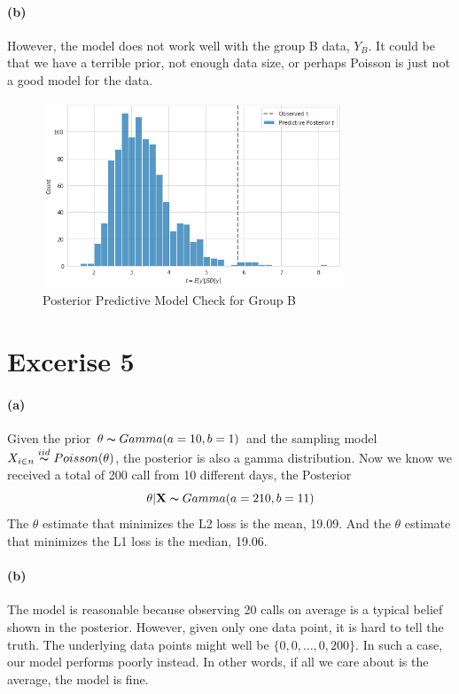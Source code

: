\documentclass[11pt, letterpaper]{article}
\begin{document}
\paragraph{(b)}
However, the model does not work well with the group B data, $Y_B$. It could be that we have a terrible prior,
not enough data size, or perhaps Poisson is just not a good model for the data.

\begin{figure}[!h]
  \centering
  \includegraphics[width=0.8\textwidth]{4.3.b.png}
  \captionsetup{justification=centering}
  \caption{Posterior Predictive Model Check for Group B}
\end{figure}
\newpage


\section{Excerise 5}
\paragraph{(a)}
Given the prior $\theta \thicksim Gamma(a=10, b=1)$ and the sampling model
$X_{i \in n} \overset{iid}{\thicksim} Poisson(\theta)$, the posterior is also a gamma distribution.
Now we know we received a total of 200 call from 10 different days, the Posterior
\[ \theta|\mathbf{X} \thicksim Gamma(a=210, b=11) \]
The $\theta$ estimate that minimizes the L2 loss is the mean, 19.09. And the $\theta$ estimate
that minimizes the L1 loss is the median, 19.06.

\paragraph{(b)}
The model is reasonable because observing 20 calls on average is a typical belief shown in the posterior.
However, given only one data point, it is hard to tell the truth. The underlying data points might well be
$\{0, 0, \dots, 0, 200\}$. In such a case, our model performs poorly instead. In other words, if all we
care about is the average, the model is fine.
\end{document}

